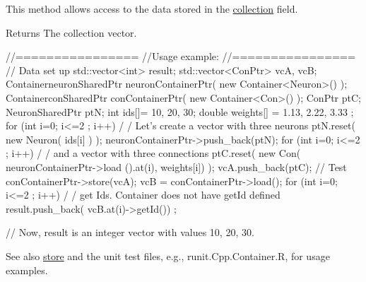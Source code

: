 This method allows access to the data stored in the \hyperlink{classvec_a_m_o_r_e_a1aa2ee42627e14994fed21bc6446993d}{collection} field. \begin{DoxyReturn}{Returns}
The collection vector.
\end{DoxyReturn}

\begin{DoxyCode}
        //================
        //Usage example:
        //================
                // Data set up
                                std::vector<int> result;
                                std::vector<ConPtr> vcA, vcB;
                                ContainerneuronSharedPtr neuronContainerPtr( new 
      Container<Neuron>() );
                                ContainerconSharedPtr    conContainerPtr( new 
      Container<Con>() );
                                ConPtr    ptC;
                                NeuronSharedPtr ptN;
                                int ids[]= {10, 20, 30};
                                double weights[] = {1.13, 2.22, 3.33 };
                                for (int i=0; i<=2 ; i++) {                             /
      / Let's create a vector with three neurons
                                        ptN.reset( new Neuron( ids[i] ) );
                                        neuronContainerPtr->push_back(ptN);
                                }
                                for (int i=0; i<=2 ; i++) {                             /
      / and a vector with three connections
                                        ptC.reset( new Con( neuronContainerPtr->load
      ().at(i), weights[i]) );
                                        vcA.push_back(ptC);
                                }
                // Test
                        conContainerPtr->store(vcA);
                        vcB = conContainerPtr->load();
                        for (int i=0; i<=2 ; i++) {                                     /
      / get Ids. Container does not have getId defined
                                        result.push_back( vcB.at(i)->getId())
      ;
                        }

                // Now, result is an integer vector with values 10, 20, 30.
\end{DoxyCode}


\begin{DoxySeeAlso}{See also}
\hyperlink{classvec_a_m_o_r_e_ad1594c084d534c3de7acedd714f2e12a}{store} and the unit test files, e.g., runit.Cpp.Container.R, for usage examples. 
\end{DoxySeeAlso}


